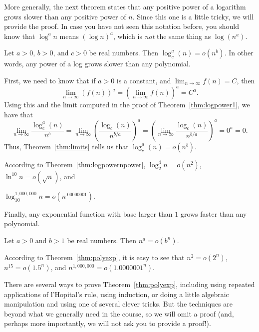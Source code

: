 More generally, the next theorem states that 
any positive power of a logarithm grows slower than any positive
power of $n$.  Since this one is a little tricky, we will provide the proof.
In case you have not seen this notation before, you should know that $\log^a n$
means $(\log n)^a$, which is {\em not} the same thing as $\log (n^a)$.

\begin{thm}\label{thm:logpowernpower}
Let $a>0$, $b>0$, and $c>0$ be real numbers. Then $\log_c^a (n)=o(n^b)$.
In other words, any power of a log grows slower than any polynomial.
\begin{pf}
First, we need to know that if $a>0$ is a constant, and
$\displaystyle\lim_{n\rightarrow\infty}f(n)=C$, then
$$\displaystyle\lim_{n\rightarrow\infty}(f(n))^a
=\left(\displaystyle\lim_{n\rightarrow\infty}f(n)\right)^a
=C^a.$$
Using this and the limit computed in the proof of Theorem~\ref{thm:logpower1}, we have that 
$$\displaystyle \lim_{n\rightarrow\infty} \frac{\log_c^a(n)}{n^b} 
=\displaystyle \lim_{n\rightarrow\infty} \left(\frac{\log_c(n)}{n^{b/a}}\right)^a 
=\left(\displaystyle \lim_{n\rightarrow\infty}\frac{\log_c(n)}{n^{b/a}}\right)^a 
=0^a=0.
$$
Thus, Theorem~\ref{thm:limits} tells us that $\log_c^a(n)=o(n^b)$.
\end{pf}
\end{thm}

\begin{exa}
According to Theorem~\ref{thm:logpowernpower}, $\log_2^4 n= o(n^2)$,
$\ln^{10} n =o(\sqrt{n})$,
and

\noindent
$\log_{10}^{1,000,000} n= o(n^{.00000001})$.
\end{exa}

Finally, any exponential function with base larger than $1$ grows faster than any polynomial.


\begin{thm}\label{thm:polyexp}
Let $a>0$ and $b>1$ be real numbers. Then $n^a=o(b^n)$.
\end{thm}

\begin{exa}
According to Theorem~\ref{thm:polyexp}, it is easy to see that $n^2=o(2^n)$, $n^{15}=o(1.5^n)$,
and $n^{1,000,000}=o(1.0000001^n)$.
\end{exa}

There are several ways to prove Theorem~\ref{thm:polyexp}, including using repeated 
applications of l'Hopital's rule, using induction, or doing a little
algebraic manipulation and using one of several clever tricks.
But the techniques are beyond what we generally need in the course, so we will
omit a proof (and, perhaps more importantly, we will not ask you to provide a proof!).


